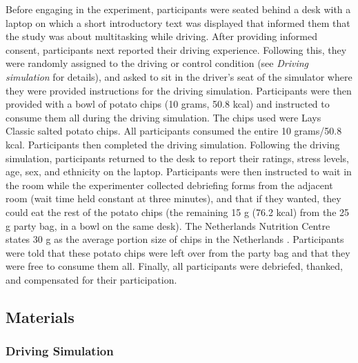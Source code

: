 \documentclass[authordate, empirical, issue]{jote-new-article}
\begin{document}
Before engaging in the experiment, participants were seated behind a desk with a laptop on which a short introductory text was displayed that informed them that the study was about multitasking while driving. After providing informed consent, participants next reported their driving experience. Following this, they were randomly assigned to the driving or control condition (see \emph{Driving simulation} for details), and asked to sit in the driver’s seat of the simulator where they were provided instructions for the driving simulation. Participants were then provided with a bowl of potato chips (10 grams, 50.8 kcal) and instructed to consume them all during the driving simulation. The chips used were Lays Classic salted potato chips. All participants consumed the entire 10 grams/50.8 kcal. Participants then completed the driving simulation. Following the driving simulation, participants returned to the desk to report their ratings, stress levels, age, sex, and ethnicity on the laptop. Participants were then instructed to wait in the room while the experimenter collected debriefing forms from the adjacent room (wait time held constant at three minutes), and that if they wanted, they could eat the rest of the potato chips (the remaining 15 g (76.2 kcal) from the 25 g party bag, in a bowl on the same desk). The Netherlands Nutrition Centre states 30 g as the average portion size of chips in the Netherlands \parencites{VoedingscentrumND}. Participants were told that these potato chips were left over from the party bag and that they were free to consume them all. Finally, all participants were debriefed, thanked, and compensated for their participation.



\subsection{Materials}



\subsubsection{Driving Simulation }
\end{document}
